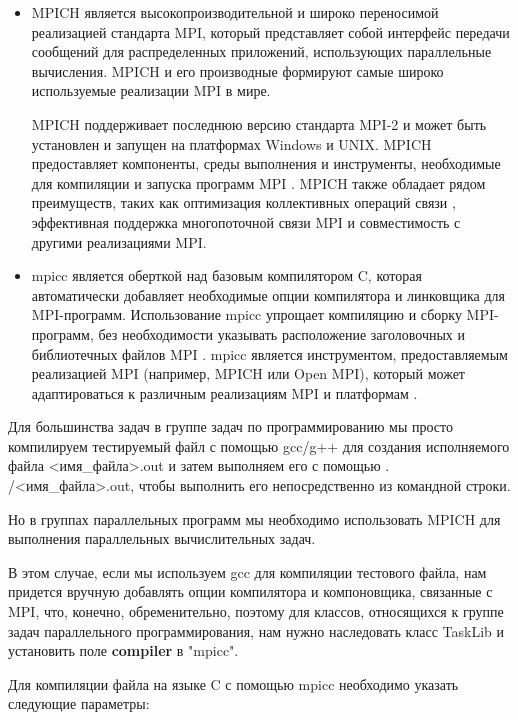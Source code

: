 \begin{itemize}
	\item MPICH является высокопроизводительной и широко переносимой реализацией 
	стандарта MPI, который представляет собой интерфейс передачи сообщений для распределенных 
	приложений, использующих параллельные вычисления. MPICH и его производные формируют самые 
	широко используемые реализации MPI в мире. 
	
	MPICH поддерживает последнюю версию стандарта MPI-2 и может быть установлен и запущен
	 на платформах Windows и UNIX. MPICH предоставляет компоненты, среды выполнения и 
	 инструменты, необходимые для компиляции и запуска программ MPI \cite{ref3} \cite{ref5}. 
	 MPICH также обладает рядом преимуществ, таких как оптимизация коллективных операций 
	 связи \cite{ref4}, эффективная поддержка многопоточной связи MPI  и совместимость с 
	 другими реализациями MPI.
	
	\item 	mpicc является оберткой над базовым компилятором C, которая автоматически 
	добавляет необходимые опции компилятора и линковщика для MPI-программ. Использование
	mpicc упрощает компиляцию и сборку MPI-программ, без необходимости указывать 
	расположение заголовочных и библиотечных файлов MPI \cite{ref7} \cite{ref8}. 
	mpicc является инструментом, предоставляемым реализацией MPI (например, 
	MPICH или Open MPI), который может адаптироваться к различным реализациям 
	MPI и платформам \cite{ref9} \cite{ref10}.
\end{itemize}

Для большинства задач в группе задач по программированию мы просто компилируем тестируемый файл с помощью gcc/g++ для создания 
исполняемого файла <имя\_файла>.out и затем выполняем его с помощью . /<имя\_файла>.out, чтобы выполнить его непосредственно из командной строки.

Но в группах параллельных программ мы необходимо использовать MPICH для выполнения параллельных вычислительных задач. 

В этом случае, если мы используем gcc для компиляции тестового файла, нам придется 
вручную добавлять опции компилятора и компоновщика, связанные с MPI, что, конечно, 
обременительно, поэтому для классов, относящихся к группе задач параллельного 
программирования, нам нужно наследовать класс TaskLib и установить поле \textbf{compiler} в "mpicc".

 Для компиляции файла на языке C с помощью mpicc необходимо указать следующие параметры:

